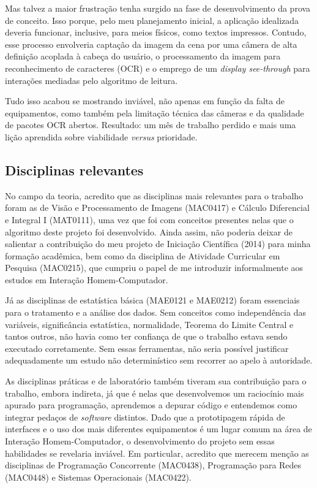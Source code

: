 \documentclass[12pt]{article}
\begin{document}
		Mas talvez a maior frustração tenha surgido na fase de desenvolvimento da prova de conceito. Isso porque, pelo meu planejamento inicial, a aplicação idealizada deveria funcionar, inclusive, para meios físicos, como textos impressos. Contudo, esse processo envolveria captação da imagem da cena por uma câmera de alta definição acoplada à cabeça do usuário, o processamento da imagem para reconhecimento de caracteres (OCR) e o emprego de um \textit{display see-through} para interações mediadas pelo algoritmo de leitura. 
		
		Tudo isso acabou se mostrando inviável, não apenas em função da falta de equipamentos, como também pela limitação técnica das câmeras e da qualidade de pacotes OCR abertos. Resultado: um mês de trabalho perdido e mais uma lição aprendida sobre viabilidade \textit{versus} prioridade.
		
		
		\subsection{Disciplinas relevantes}
		No campo da teoria, acredito que as disciplinas mais relevantes para o trabalho foram as de Visão e Processamento de Imagens (MAC0417) e Cálculo Diferencial e Integral I (MAT0111), uma vez que foi com conceitos presentes nelas que o algoritmo deste projeto foi desenvolvido. Ainda assim, não poderia deixar de salientar a contribuição do meu projeto de Iniciação Científica (2014) para minha formação acadêmica, bem como da disciplina de Atividade Curricular em Pesquisa (MAC0215), que cumpriu o papel de me introduzir informalmente aos estudos em Interação Homem-Computador. 
		
		Já as disciplinas de estatística básica (MAE0121 e MAE0212) foram essenciais para o tratamento e a análise dos dados. Sem conceitos como independência das variáveis, significância estatística, normalidade, Teorema do Limite Central e tantos outros, não havia como ter confiança de que o trabalho estava sendo executado corretamente. Sem essas ferramentas, não seria possível justificar adequadamente um estudo não determinístico sem recorrer ao apelo à autoridade.
		
		As disciplinas práticas e de laboratório também tiveram sua contribuição para o trabalho, embora indireta, já que é nelas que desenvolvemos um raciocínio mais apurado para programação, aprendemos a depurar código e entendemos como integrar pedaços de \textit{software} distintos. Dado que a prototipagem rápida de interfaces e o uso dos mais diferentes equipamentos é um lugar comum na área de Interação Homem-Computador, o desenvolvimento do projeto sem essas habilidades se revelaria inviável. Em particular, acredito que merecem menção as disciplinas de Programação Concorrente (MAC0438), Programação para Redes (MAC0448) e Sistemas Operacionais (MAC0422).
		
\end{document}
